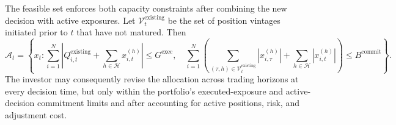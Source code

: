 \documentclass{article}
\begin{document}
The feasible set enforces both capacity constraints after combining the
new decision with active exposures. Let
$\mathcal{V}_t^{\mathrm{existing}}$ be the set of position vintages
initiated prior to $t$ that have not matured. Then
\[
    \mathcal{A}_t
    =
    \left\{
        x_t :
        \sum_{i=1}^{N}
        \left|
            Q_{i,t}^{\mathrm{existing}}
            +
            \sum_{h \in \mathcal{H}}x_{i,t}^{(h)}
        \right|
        \leq G^{\mathrm{exec}},
        \quad
        \sum_{i=1}^{N}
        \left(
            \sum_{(\tau,h)\in\mathcal{V}_t^{\mathrm{existing}}}
            \left|x_{i,\tau}^{(h)}\right|
            +
            \sum_{h\in\mathcal{H}}\left|x_{i,t}^{(h)}\right|
        \right)
        \leq B^{\mathrm{commit}}
    \right\}.
\]
The investor may consequently revise the allocation across trading
horizons at every decision time, but only within the portfolio's
executed-exposure and active-decision commitment limits and after
accounting for active positions, risk, and adjustment cost.
\end{document}

